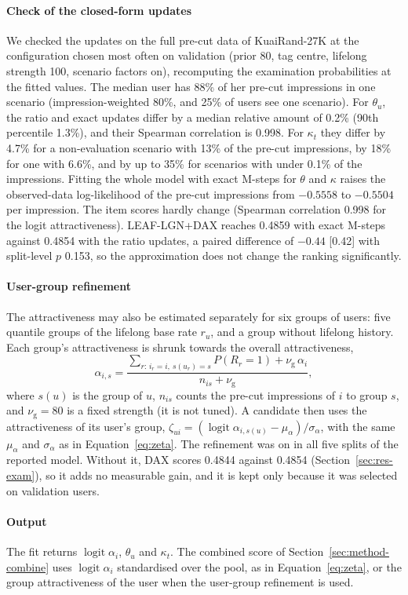 \paragraph{Check of the closed-form updates} We checked the updates on the full pre-cut data of KuaiRand-27K at the configuration chosen most
often on validation (prior 80, tag centre, lifelong strength 100, scenario factors on), recomputing the examination probabilities at the fitted
values. The median user has 88\% of her pre-cut impressions in one scenario (impression-weighted 80\%, and 25\% of users see one scenario). For
$\theta_u$, the ratio and exact updates differ by a median relative amount of 0.2\% (90th percentile 1.3\%), and their Spearman correlation is
0.998. For $\kappa_t$ they differ by 4.7\% for a non-evaluation scenario with 13\% of the pre-cut impressions, by 18\% for one with 6.6\%, and by up
to 35\% for scenarios with under 0.1\% of the impressions. Fitting the whole model with exact M-steps for $\theta$ and $\kappa$ raises the
observed-data log-likelihood of the pre-cut impressions from $-0.5558$ to $-0.5504$ per impression. The item scores hardly change (Spearman
correlation 0.998 for the logit attractiveness). LEAF-LGN+DAX reaches 0.4859 with exact M-steps against 0.4854 with the ratio updates, a paired
difference of $-0.44$ [0.42] with split-level $p$ 0.153, so the approximation does not change the ranking significantly.

\paragraph{User-group refinement} The attractiveness may also be estimated separately for six groups of users: five quantile groups of the lifelong
base rate $r_u$, and a group without lifelong history. Each group's attractiveness is shrunk towards the overall attractiveness,
\[
\alpha_{i,s}=\frac{\sum_{r:\,i_r=i,\ s(u_r)=s}P(R_r=1)+\nu_{\mathrm g}\,\alpha_i}{n_{is}+\nu_{\mathrm g}},
\]
where $s(u)$ is the group of $u$, $n_{is}$ counts the pre-cut impressions of $i$ to group $s$, and $\nu_{\mathrm g}=80$ is a fixed strength (it is not
tuned). A candidate then uses the attractiveness of its user's group, $\zeta_{ui}=(\operatorname{logit}\alpha_{i,s(u)}-\mu_\alpha)/\sigma_\alpha$, with the same
$\mu_\alpha$ and $\sigma_\alpha$ as in Equation~\eqref{eq:zeta}. The refinement was on in all five splits of the reported model. Without it, DAX
scores 0.4844 against 0.4854 (Section~\ref{sec:res-exam}), so it adds no measurable gain, and it is kept only because it was selected on validation users.

\paragraph{Output} The fit returns $\operatorname{logit}\alpha_i$, $\theta_u$ and $\kappa_t$. The combined score of Section~\ref{sec:method-combine} uses
$\operatorname{logit}\alpha_i$ standardised over the pool, as in Equation~\eqref{eq:zeta}, or the group attractiveness of the user when the
user-group refinement is used.
